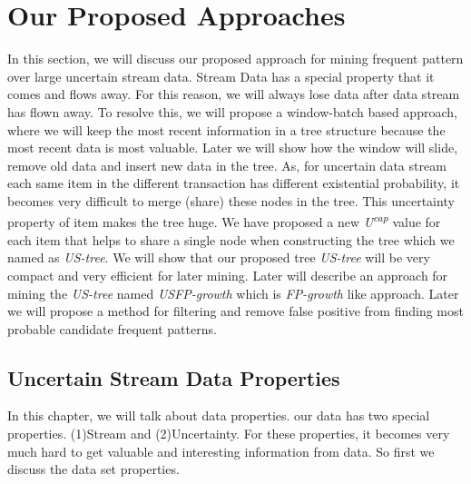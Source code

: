 %

\chapter{Our Proposed Approaches}

In this section, we will discuss our proposed approach for mining frequent pattern over large uncertain stream data. Stream Data has a special property that it comes and flows away. For this reason, we will always lose data after data stream has flown away. To resolve this, we will propose a window-batch based approach, where we will keep the most recent information in a tree structure because the most recent data is most valuable. Later we will show how the window will slide, remove old data and insert new data in the tree. As, for uncertain data stream each same item in the different transaction has different existential probability, it becomes very difficult to merge (share) these nodes in the tree. This uncertainty property of item makes the tree huge. We have proposed a new \emph{U\textsuperscript{cap}} value for each item that helps to share a single node when constructing the tree which we named as \emph{US-tree}. We will show that our proposed tree \emph{US-tree} will be very compact and very efficient for later mining. Later will describe an approach for mining the \emph {US-tree} named \emph{USFP-growth} which is \emph{FP-growth} like approach. Later we will propose a method for filtering and remove false positive from finding most probable candidate frequent patterns.

\section{Uncertain Stream Data Properties}
    In this chapter, we will talk about data properties. our data has two special properties. (1)Stream and (2)Uncertainty. For these properties, it becomes very much hard to get valuable and interesting information from data. So first we discuss the data set properties.


